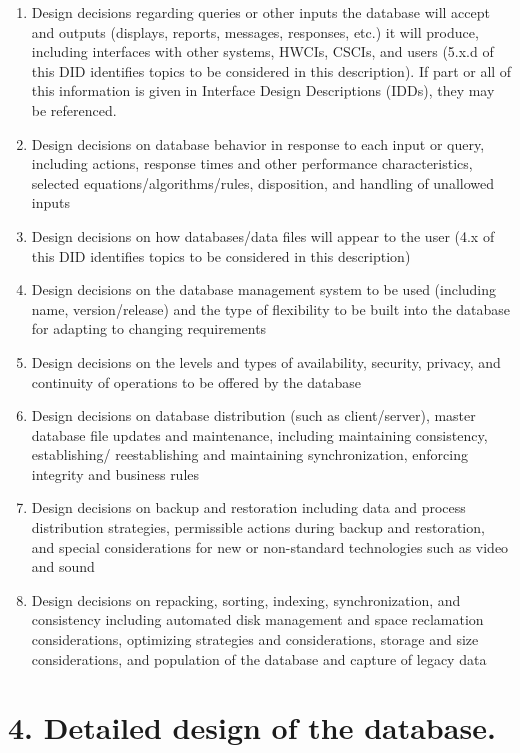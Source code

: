 \begin{enumerate}
\itemsep1pt\parskip0pt
\item
  Design decisions regarding queries or other inputs the database will
  accept and outputs (displays, reports, messages, responses, etc.) it
  will produce, including interfaces with other systems, HWCIs, CSCIs,
  and users (5.x.d of this DID identifies topics to be considered in
  this description). If part or all of this information is given in
  Interface Design Descriptions (IDDs), they may be referenced.
\item
  Design decisions on database behavior in response to each input or
  query, including actions, response times and other performance
  characteristics, selected equations/algorithms/rules, disposition, and
  handling of unallowed inputs
\item
  Design decisions on how databases/data files will appear to the user
  (4.x of this DID identifies topics to be considered in this
  description)
\item
  Design decisions on the database management system to be used
  (including name, version/release) and the type of flexibility to be
  built into the database for adapting to changing requirements
\item
  Design decisions on the levels and types of availability, security,
  privacy, and continuity of operations to be offered by the database
\item
  Design decisions on database distribution (such as client/server),
  master database file updates and maintenance, including maintaining
  consistency, establishing/ reestablishing and maintaining
  synchronization, enforcing integrity and business rules
\item
  Design decisions on backup and restoration including data and process
  distribution strategies, permissible actions during backup and
  restoration, and special considerations for new or non-standard
  technologies such as video and sound
\item
  Design decisions on repacking, sorting, indexing, synchronization, and
  consistency including automated disk management and space reclamation
  considerations, optimizing strategies and considerations, storage and
  size considerations, and population of the database and capture of
  legacy data
\end{enumerate}

\section{4. Detailed design of the database.}

